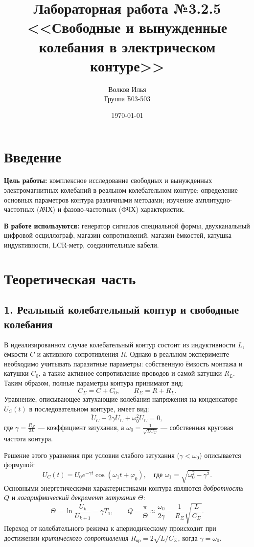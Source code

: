 \documentclass[a4paper,12pt]{extarticle}
\title{Лабораторная работа №3.2.5\\
       <<Свободные и вынужденные колебания в электрическом контуре>>}
\author{Волков Илья \\ Группа Б03-503}
\date{\today}
\begin{document}
\maketitle

\section*{Введение}
\textbf{Цель работы:} комплексное исследование свободных и вынужденных электромагнитных колебаний в реальном колебательном контуре; определение основных параметров контура различными методами; изучение амплитудно-частотных (АЧХ) и фазово-частотных (ФЧХ) характеристик.

\textbf{В работе используются:} генератор сигналов специальной формы, двухканальный цифровой осциллограф, магазин сопротивлений, магазин ёмкостей, катушка индуктивности, LCR-метр, соединительные кабели.

\newpage
\section*{Теоретическая часть}

\subsection*{1. Реальный колебательный контур и свободные колебания}
В идеализированном случае колебательный контур состоит из индуктивности $L$, ёмкости $C$ и активного сопротивления $R$. Однако в реальном эксперименте необходимо учитывать паразитные параметры: собственную ёмкость монтажа и катушки $C_0$, а также активное сопротивление проводов и самой катушки $R_L$. Таким образом, полные параметры контура принимают вид:
\begin{equation}
    C_\Sigma = C + C_0, \qquad R_\Sigma = R + R_L.
\end{equation}
Уравнение, описывающее затухающие колебания напряжения на конденсаторе $U_C(t)$ в последовательном контуре, имеет вид:
\begin{equation}
    \ddot{U}_C + 2\gamma \dot{U}_C + \omega_0^2 U_C = 0,
\end{equation}
где $\gamma = \frac{R_\Sigma}{2L}$ --- коэффициент затухания, а $\omega_0 = \frac{1}{\sqrt{LC_\Sigma}}$ --- собственная круговая частота контура. 

Решение этого уравнения при условии слабого затухания ($\gamma < \omega_0$) описывается формулой:
\begin{equation}
    U_C(t) = U_0 e^{-\gamma t} \cos(\omega_1 t + \varphi_0), \quad \text{где } \omega_1 = \sqrt{\omega_0^2 - \gamma^2}.
\end{equation}
Основными энергетическими характеристиками контура являются \textit{добротность} $Q$ и \textit{логарифмический декремент затухания} $\Theta$:
\begin{equation}
    \Theta = \ln \frac{U_k}{U_{k+1}} = \gamma T_1, \qquad Q = \frac{\pi}{\Theta} \approx \frac{\omega_0}{2\gamma} = \frac{1}{R_\Sigma}\sqrt{\frac{L}{C_\Sigma}}.
\end{equation}
Переход от колебательного режима к апериодическому происходит при достижении \textit{критического сопротивления} $R_{\text{кр}} = 2\sqrt{L/C_\Sigma}$, когда $\gamma = \omega_0$.
\end{document}
